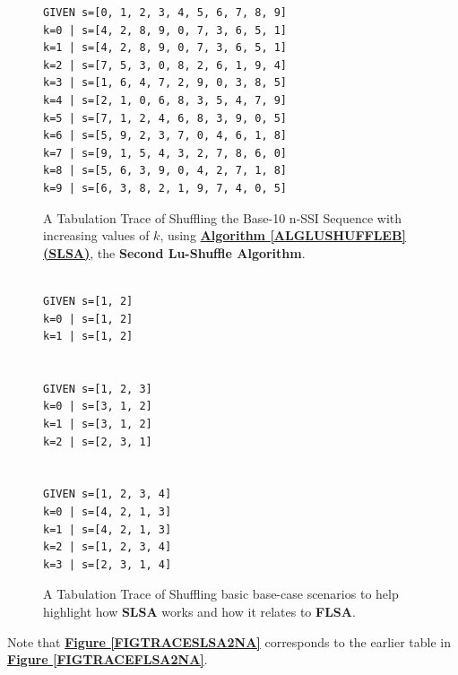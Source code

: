 \documentclass[a4paper, 18pt]{book} %
\begin{document}
\begin{figure}[H]
  \begin{center}
\Large
\begin{verbatim}
GIVEN s=[0, 1, 2, 3, 4, 5, 6, 7, 8, 9]
k=0 | s=[4, 2, 8, 9, 0, 7, 3, 6, 5, 1]
k=1 | s=[4, 2, 8, 9, 0, 7, 3, 6, 5, 1]
k=2 | s=[7, 5, 3, 0, 8, 2, 6, 1, 9, 4]
k=3 | s=[1, 6, 4, 7, 2, 9, 0, 3, 8, 5]
k=4 | s=[2, 1, 0, 6, 8, 3, 5, 4, 7, 9]
k=5 | s=[7, 1, 2, 4, 6, 8, 3, 9, 0, 5]
k=6 | s=[5, 9, 2, 3, 7, 0, 4, 6, 1, 8]
k=7 | s=[9, 1, 5, 4, 3, 2, 7, 8, 6, 0]
k=8 | s=[5, 6, 3, 9, 0, 4, 2, 7, 1, 8]
k=9 | s=[6, 3, 8, 2, 1, 9, 7, 4, 0, 5]
\end{verbatim}

   \caption{A Tabulation Trace of Shuffling the Base-10 n-SSI Sequence with increasing values of $k$, using \textbf{\hyperref[ALGLUSHUFFLEB]{Algorithm \ref{ALGLUSHUFFLEB} (SLSA)}}, the \textbf{Second Lu-Shuffle Algorithm}.}
  \label{FIGTRACESLSA}
  \end{center}
\end{figure}


\begin{figure}[H]
  \begin{center}
\Large
\begin{verbatim}

GIVEN s=[1, 2]
k=0 | s=[1, 2]
k=1 | s=[1, 2]


GIVEN s=[1, 2, 3]
k=0 | s=[3, 1, 2]
k=1 | s=[3, 1, 2]
k=2 | s=[2, 3, 1]


GIVEN s=[1, 2, 3, 4]
k=0 | s=[4, 2, 1, 3]
k=1 | s=[4, 2, 1, 3]
k=2 | s=[1, 2, 3, 4]
k=3 | s=[2, 3, 1, 4]
\end{verbatim}

   \caption{A Tabulation Trace of Shuffling basic base-case scenarios to help highlight how \textbf{SLSA} works and how it relates to \textbf{FLSA}.}
  \label{FIGTRACESLSASIMPLE}
  \end{center}
\end{figure}



Note that \textbf{\hyperref[FIGTRACESLSA2NA]{Figure \ref{FIGTRACESLSA2NA}}} corresponds to the earlier table in \textbf{\hyperref[FIGTRACEFLSA2NA]{Figure \ref{FIGTRACEFLSA2NA}}}.
\end{document}
